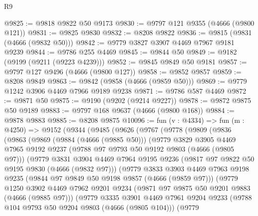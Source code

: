 \begin{lexlean}{R9}
\begin{coremodule}
@9825 := @9818 @9822 @50 @9173
@9830 := @9797 @121 @9355 (@4666 (@9800 @121))
@9831 := @9825 @9830
@9832 := @8208 @9822
@9836 := @9815 (@9831 (@4666 (@9832 @50)))
@9842 := @9779 @3827 @3907 @4469 @7967 @9181 @9239
@9844 := @9786 @255 @4469
@9845 := @9844 @50
@9849 := @9182 (@9199 (@9211 (@9223 @4239)))
@9852 := @9845 @9849 @50 @9181
@9857 := @9797 @127 @9496 (@4666 (@9800 @127))
@9858 := @9852 @9857
@9859 := @8208 @9849
@9863 := @9842 (@9858 (@4666 (@9859 @50)))
@9869 := @9779 @1242 @3906 @4469 @7966 @9189 @9238
@9871 := @9786 @587 @4469
@9872 := @9871 @50
@9875 := @9190 (@9202 (@9214 @9227))
@9878 := @9872 @9875 @50 @9189
@9883 := @9797 @168 @9637 (@4666 (@9800 @168))
@9884 := @9878 @9883
@9885 := @8208 @9875
@10096 := fun (v : @4334) =>
  fun (m : @4250) =>
  @9152
    (@9344
      (@9485
        (@9626
          (@9767
            (@9778
              (@9809
                (@9836
                  (@9863
                    (@9869
                      (@9884 (@4666 (@9885 @50)))
                      (@9779
                        @3829
                        @3905
                        @4469
                        @7965
                        @9192
                        @9237
                        (@9788 @97 @9793 @50 @9192 @9803 (@4666 (@9805 @97)))
                        (@9779
                          @3831
                          @3904
                          @4469
                          @7964
                          @9195
                          @9236
                          (@9817 @97 @9822 @50 @9195 @9830 (@4666 (@9832 @97)))
                          (@9779
                            @3833
                            @3903
                            @4469
                            @7963
                            @9198
                            @9235
                            (@9844 @97 @9849 @50 @9198 @9857 (@4666 (@9859 @97)))
                            (@9779
                              @1250
                              @3902
                              @4469
                              @7962
                              @9201
                              @9234
                              (@9871 @97 @9875 @50 @9201 @9883 (@4666 (@9885 @97)))
                              (@9779
                                @3335
                                @3901
                                @4469
                                @7961
                                @9204
                                @9233
                                (@9788 @104 @9793 @50 @9204 @9803 (@4666 (@9805 @104)))
                                (@9779

\end{coremodule}
\end{lexlean}
